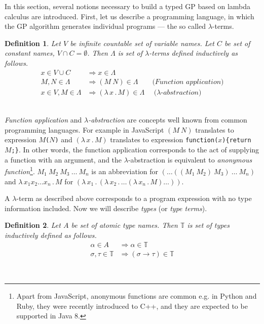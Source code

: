 \documentclass[conference]{IEEEtran}
\newtheorem{definition}{Definition}
\newcommand{\lets}{let us\xspace}
\newcommand{\lterm}{$\lambda$-term\xspace}
\newcommand{\lterms}{$\lambda$-terms\xspace}
\newcommand{\then}{\Rightarrow\xspace}
\newcommand{\lamb}[2]{( \lambda \, #1 \, . \, #2 )}
\newcommand{\lam}[2]{\lambda \, #1 \, . \, #2}
\newcommand{\ar}{\rightarrow\xspace}
\newcommand{\T}{\mathbb{T}\xspace}
\begin{document}
In this section, several notions necessary to build a typed GP based on lambda calculus are introduced. 
First, \lets describe a programming language, 
in which the GP algorithm generates individual programs --- the so called \lterms.\\

\begin{definition}
Let $V$ be infinite countable set of {\it 
variable names}. Let $C$ be set of {\it constant names}, 
$V \cap C = \emptyset$.	 	
Then $\Lambda$ is set of {\it \lterms} defined inductively as follows.	
\begin{align*}
x   \in V \cup C  &\then x     \in \Lambda \\
M,N \in \Lambda   &\then (M~N) \in \Lambda 
\textit{~~~~~~(Function application)} \\
x   \in V , M \in \Lambda &\then \lamb{x}{M} \in \Lambda
\textit{~~~~($\lambda$-abstraction)} 
\end{align*}
\end{definition}
~\\

\textit{Function application} and 
\textit{$\lambda$-abstraction} are concepts
well known from common programming languages. 
For example in JavaScript 
$(M~N)$ translates to expression \texttt{$M$($N$)} and
$\lamb{x}{M}$ translates to expression \texttt{function($x$)\{return $M$;\}}.
In other words, the function application 
corresponds to the act of supplying a function 
with an argument, and
the $\lambda$-abstraction is equivalent to 
\textit{anonymous function}\footnote{Apart from JavaScript, anonymous functions are common e.g. in Python and Ruby, 
they were recently introduced to C++, and they are expected to be supported in Java 8.}.
$M_1~M_2~M_3~\dots~M_n$ is an abbreviation for $(\dots((M_1~M_2)~M_3)~\dots~M_n)$
and $\lam{x_1 x_2 \dots x_n }{M}$ for $\lamb{x_1}{\lamb{x_2}{\dots\lamb{x_n}{M}\dots}}$.

A \lterm as described above
corresponds to a program expression with no type information
included. Now we will describe \textit{types} (or \textit{type terms}).\\

\begin{definition}
Let $A$ be set of {\it atomic type names}. 
Then $\mathbb{T}$ is set of {\it types} inductively defined as follows.
\begin{align*}
\alpha      \in A  &\then   \alpha \in \T \\
\sigma,\tau \in \T &\then ( \sigma \ar  \tau ) \in \T 
\end{align*}
\end{definition}
~\\
\end{document}
